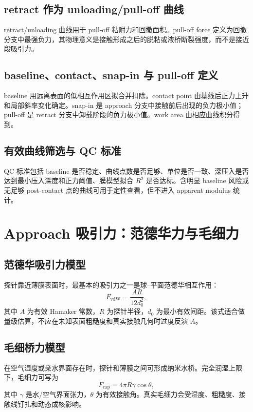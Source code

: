 \documentclass[UTF8,11pt,fontset=fandol]{ctexart}
\begin{document}
\subsection{retract 作为 unloading/pull-off 曲线}
retract/unloading 曲线用于 pull-off 粘附力和回撤面积。pull-off force 定义为回撤分支中最强负力，其物理意义是接触形成之后的脱粘或液桥断裂强度，而不是接近段吸引力。

\subsection{baseline、contact、snap-in 与 pull-off 定义}
baseline 用远离表面的低相互作用区拟合并扣除。contact point 由基线后正力上升和局部斜率变化确定。snap-in 是 approach 分支中接触前后出现的负力极小值；pull-off 是 retract 分支中卸载阶段的负力极小值。work area 由相应曲线积分得到。

\subsection{有效曲线筛选与 QC 标准}
QC 标准包括 baseline 是否稳定、曲线点数是否足够、单位是否一致、深压入是否达到最小压入深度和正力阈值、膜模型拟合 $R^2$ 是否达标。含明显 baseline 风险或无足够 post-contact 点的曲线可用于定性查看，但不进入 apparent modulus 统计。

\section{Approach 吸引力：范德华力与毛细力}
\subsection{范德华吸引力模型}
探针靠近薄膜表面时，最基本的吸引力之一是球--平面范德华相互作用：
\begin{equation}
    F_\mathrm{vdW}=\frac{A R}{12 d_0^2},
    \label{eq:vdw}
\end{equation}
其中 $A$ 为有效 Hamaker 常数，$R$ 为探针半径，$d_0$ 为最小有效间距。该式适合做量级估算，不应在未知表面粗糙度和真实接触几何时过度反演 $A$。

\subsection{毛细桥力模型}
在空气湿度或亲水界面存在时，探针和薄膜之间可形成纳米水桥。完全润湿上限下，毛细力可写为
\begin{equation}
    F_\mathrm{cap}=4\pi R\gamma\cos\theta,
    \label{eq:capillary}
\end{equation}
其中 $\gamma$ 是水/空气界面张力，$\theta$ 为有效接触角。真实毛细力会受湿度、粗糙度、接触线钉扎和动态成核影响\cite{butt2005,israelachvili2011}。
\end{document}
